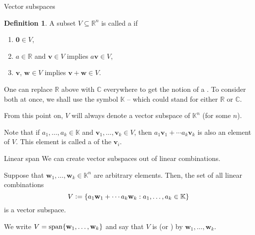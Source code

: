 \documentclass[dvipsnames]{beamer}
\theoremstyle{definition}
\newtheorem{defn}[thm]{Definition}
\let\subset\subseteq
\begin{document}
\begin{frame}{Vector subspaces}
    \begin{defn}
        A subset $V \subset \mathbb{R}^{n}$ is called a  if
        \begin{enumerate}[<+->]
            \item $\mathbf{0} \in V$,
            \item $a \in \mathbb{R}$ and $\mathbf{v} \in V$ implies $a \mathbf{v} \in V$,
            \item $\mathbf{v}$, $\mathbf{w} \in V$ implies $\mathbf{v} + \mathbf{w} \in V$.
        \end{enumerate}
    \end{defn} \pause

    One can replace $\mathbb{R}$ above with $\mathbb{C}$ everywhere to get the notion of a . \pause To consider both at once, we shall use the symbol $\mathbb{K}$ -- which could stand for either $\mathbb{R}$ or $\mathbb{C}$.

    From this point on, $V$ will always denote a vector subspace of $\mathbb{K}^{n}$ (for some $n$). \pause

    Note that if $a_{1}, \ldots, a_{k} \in \mathbb{K}$ and $\mathbf{v}_{1}, \ldots, \mathbf{v}_{k} \in V$, then $a_{1} \mathbf{v}_{1} + \cdots a_{k} \mathbf{v}_{k}$ is also an element of $V$. \pause This element is called a  of the $\mathbf{v}_{i}$.
\end{frame}
\begin{frame}{Linear span}
    We can create vector subspaces out of linear combinations. \pause

    Suppose that $\mathbf{w}_{1}, \ldots, \mathbf{w}_{k} \in \mathbb{K}^{n}$ are arbitrary elements. \pause Then, the set of all linear combinations
    \begin{equation*} 
        V \vcentcolon= \{a_{1} \mathbf{w}_{1} + \cdots a_{k} \mathbf{w}_{k} : a_{1}, \ldots, a_{k} \in \mathbb{K}\}
    \end{equation*}
    is a vector subspace. \pause 

    We write $V = \operatorname{span}\{\mathbf{w}_{1}, \ldots, \mathbf{w}_{k}\}$ and say that $V$ is  (or ) by $\mathbf{w}_{1}, \ldots, \mathbf{w}_{k}$.
\end{frame}
\end{document}
